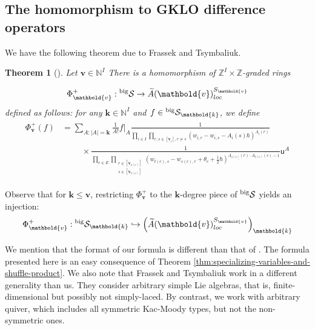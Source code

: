 \documentclass[11pt,reqno]{amsart}
\renewcommand{\mathbf}{\mathbold}
\numberwithin{equation}{section}
\newtheorem{Theorem}[equation]{Theorem}
\theoremstyle{definition}
\newcommand{\cS}{\mathcal{S}}
\newcommand{\bk}{\mathbf{k}}
\newcommand{\bv}{\mathbf{v}}
\newcommand{\NN}{\mathbb{N}}
\newcommand{\ZZ}{\mathbb{Z}}
\renewcommand{\tilde}[1]{\widetilde{#1}}
\newcommand{\leftexp}[2]{\vphantom{#2}^{#1} #2}
\renewcommand{\bv}{\mathbf{v}} %
\newcommand{\su}{\mathsf{u}} %
\newcommand{\vertexset}{I}
\newcommand{\GKLO}[1]{\tilde{A}(#1)_{loc}}
\newcommand{\preshu}{\leftexp{\mathrm{big}}{\cS}}
\begin{document}
\subsection{The homomorphism to GKLO difference operators}
\label{ssec: GKLO hom}

We have the following theorem due to Frassek and Tsymbaliuk.

\begin{Theorem}[\mbox{\cite[Theorem B.17]{Frassek-Tsymbaliuk-2022}}]
  \label{thm:FFT-homomorphism}
  Let $\bv \in \NN^\vertexset$  There is a homomorphism  of $\ZZ^\vertexset\times \ZZ$-graded rings

  \begin{equation}
    \label{eq:54}
\Phi^+_\bv: \preshu \rightarrow \GKLO{\bv}^{S_\bv}  
  \end{equation}
   defined as follows: for any $\bk \in \NN^I$ and $f \in \preshu_\mathbf{k}$, we define
\begin{align}
  \label{eq:FFT-homomorphism}
  \begin{split}
\Phi^+_\bv(f) & = \sum_{A : | A | = \mathbf{k}} \frac{1}{A!} f|_A \frac{1}{\prod_{i\in I} \prod_{r,s \in [\bv_i], r \neq s}(w_{i,r}-w_{i,s} - A_i(s)\hbar)^{\overline{A_i(r)}}} \\
& \quad\ \ \  \ \ \  \times \frac{1}{\prod_{e \in E} \prod_{\substack{r \in [\bv_{s(e)}] \\ s \in [\bv_{t(e)}]}} (w_{t(e),s} - w_{s(e),r} + \theta_e + \frac{1}{2} \hbar)^{\underline{A_{s(e)}(r)}\cdot \overline{A_{t(e)}(s)-1}}} \su^A 
  \end{split}
\end{align}

\end{Theorem}
Observe that for $\bk \leq \bv$, restricting $\Phi^+_\bv$ to the $\bk$-degree piece of $\preshu$ yields an injection:
\begin{equation}
  \label{eq:53}
  \Phi_\bv^+ : \preshu_{\bk} \hookrightarrow \left(\GKLO{\bv}^{S_{\bv}}\right)_{\bk}
\end{equation}

We mention that the format of our formula is different than that of \cite[Theorem B.17]{Frassek-Tsymbaliuk-2022}. The formula presented here is an easy consequence of Theorem \ref{thm:specializing-variables-and-shuffle-product}. We also note that Frassek and Tsymbaliuk work in a different generality than us. They consider arbitrary simple Lie algebras, that is, finite-dimensional but possibly not simply-laced. By contrast, we work with arbitrary quiver, which includes all symmetric Kac-Moody types, but not the non-symmetric ones. 
\end{document}
